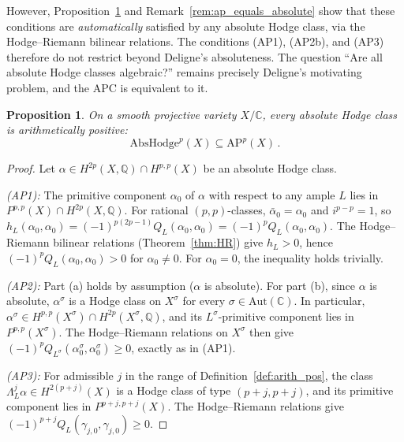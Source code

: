 \documentclass[aps,prd,twocolumn,superscriptaddress,nofootinbib]{revtex4-2}
\newtheorem{proposition}[theorem]{Proposition}
\theoremstyle{definition}
\theoremstyle{remark}
\begin{document}
However, Proposition~\ref{prop:absolute_implies_ap} and Remark~\ref{rem:ap_equals_absolute} show that these conditions are \textit{automatically} satisfied by any absolute Hodge class, via the Hodge--Riemann bilinear relations. The conditions (AP1), (AP2b), and (AP3) therefore do not restrict beyond Deligne's absoluteness. The question ``Are all absolute Hodge classes algebraic?'' remains precisely Deligne's motivating problem, and the APC is equivalent to it.

\begin{proposition}
\label{prop:absolute_implies_ap}
On a smooth projective variety $X/\mathbb{C}$, every absolute Hodge class is arithmetically positive:
\begin{equation}
\mathrm{AbsHodge}^p(X) \subseteq \mathrm{AP}^p(X)\,.
\end{equation}
\end{proposition}

\begin{proof}
Let $\alpha \in H^{2p}(X, \mathbb{Q}) \cap H^{p,p}(X)$ be an absolute Hodge class.

\textit{(AP1):} The primitive component $\alpha_0$ of $\alpha$ with respect to any ample $L$ lies in $P^{p,p}(X) \cap H^{2p}(X, \mathbb{Q})$. For rational $(p,p)$-classes, $\bar{\alpha}_0 = \alpha_0$ and $i^{p-p} = 1$, so $h_L(\alpha_0, \alpha_0) = (-1)^{p(2p-1)} Q_L(\alpha_0, \alpha_0) = (-1)^p Q_L(\alpha_0, \alpha_0)$. The Hodge--Riemann bilinear relations (Theorem~\ref{thm:HR}) give $h_L > 0$, hence $(-1)^p Q_L(\alpha_0, \alpha_0) > 0$ for $\alpha_0 \neq 0$. For $\alpha_0 = 0$, the inequality holds trivially.

\textit{(AP2):} Part (a) holds by assumption ($\alpha$ is absolute). For part (b), since $\alpha$ is absolute, $\alpha^\sigma$ is a Hodge class on $X^\sigma$ for every $\sigma \in \mathrm{Aut}(\mathbb{C})$. In particular, $\alpha^\sigma \in H^{p,p}(X^\sigma) \cap H^{2p}(X^\sigma, \mathbb{Q})$, and its $L^\sigma$-primitive component lies in $P^{p,p}(X^\sigma)$. The Hodge--Riemann relations on $X^\sigma$ then give $(-1)^p Q_{L^\sigma}(\alpha_0^\sigma, \alpha_0^\sigma) \geq 0$, exactly as in (AP1).

\textit{(AP3):} For admissible $j$ in the range of Definition~\ref{def:arith_pos}, the class $\Lambda_L^j \alpha \in H^{2(p+j)}(X)$ is a Hodge class of type $(p+j, p+j)$, and its primitive component lies in $P^{p+j, p+j}(X)$. The Hodge--Riemann relations give $(-1)^{p+j} Q_L(\gamma_{j,0}, \gamma_{j,0}) \geq 0$.
\end{proof}
\end{document}
